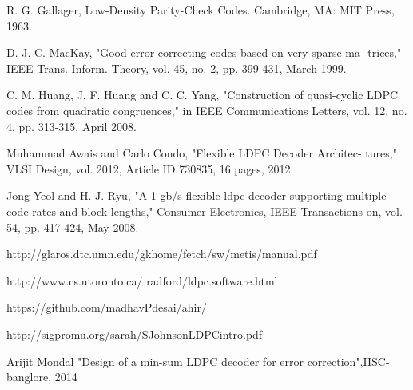 \documentclass[12pt, a4paper, oneside]{book}
\begin{document}

\label{Bibliography}


\begin{thebibliography}{9}
R. G. Gallager, Low-Density Parity-Check Codes. Cambridge, MA: MIT
Press, 1963.
 
D. J. C. MacKay, "Good error-correcting codes based on very sparse ma-
trices," IEEE Trans. Inform. Theory, vol. 45, no. 2, pp. 399-431, March
1999.
 
C. M. Huang, J. F. Huang and C. C. Yang, "Construction of quasi-cyclic
LDPC codes from quadratic congruences," in IEEE Communications
Letters, vol. 12, no. 4, pp. 313-315, April 2008.

Muhammad Awais and Carlo Condo, "Flexible LDPC Decoder Architec-
tures," VLSI Design, vol. 2012, Article ID 730835, 16 pages, 2012.

Jong-Yeol and H.-J. Ryu, "A 1-gb/s flexible ldpc decoder supporting
multiple code rates and block lengths," Consumer Electronics, IEEE
Transactions on, vol. 54, pp. 417-424, May 2008.

http://glaros.dtc.umn.edu/gkhome/fetch/sw/metis/manual.pdf 


http://www.cs.utoronto.ca/ radford/ldpc.software.html

https://github.com/madhavPdesai/ahir/

http://sigpromu.org/sarah/SJohnsonLDPCintro.pdf

Arijit Mondal "Design of a min-sum LDPC decoder for error correction",IISC-banglore, 2014
\end{thebibliography}
\clearpage


\clearpage

\acknowledgements
\end{document}
